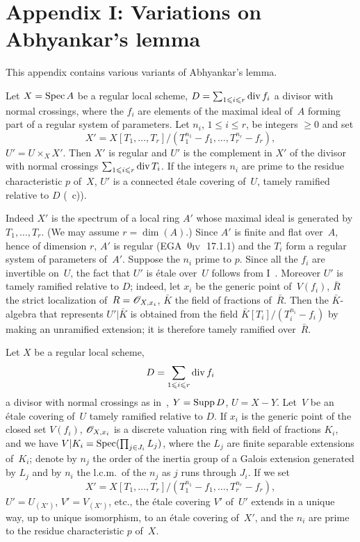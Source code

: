 \section{Appendix I: Variations on Abhyankar's lemma}
\label{XIII.5}
%
This appendix contains various variants of Abhyankar's lemma.

\begin{proposition}
\label{XIII.5.1} Let $X=\operatorname{Spec} A$ be a regular local scheme,
$D=\sum_{1\leqslant i\leqslant r} \operatorname{\mathrm{div}} f_i$ a divisor with normal
crossings, where the $f_i$ are elements of the
maximal ideal of~$A$ forming part of a regular system of
parameters. Let $n_i$, $1\leq i\leq r$, be integers $\geq 0$
and set
$$
X'=X[T_1,\dots,T_r]/(T_1^{n_1}-f_1,\dots,T_r^{n_r}-f_r),
$$
$U'=U\times_X X'$. Then $X'$ is regular and $U'$ is the
complement in $X'$ of the divisor with normal crossings
$\sum_{1\leqslant i\leqslant r}\operatorname{\mathrm{div}} T_i$. If the integers $n_i$ are prime
to the residue characteristic $p$ of~$X$, $U'$ is a
connected \'etale covering of~$U$, tamely
ramified relative to $D$ \textup{(~c))}.
\end{proposition}

Indeed $X'$ is the spectrum of a local ring $A'$ whose
maximal ideal is generated by $T_1,\dots,T_r$.
(We may assume $r=\dim(A)$.)
Since $A'$ is finite and flat over~$A$, hence of dimension $r$, $A'$ is
regular (EGA~$0_{\textup{IV}}$~17.1.1) and the $T_i$ form a regular
system of parameters of~$A'$. Suppose the $n_i$ prime
to $p$. Since all the $f_i$ are invertible on~$U$, the fact that
$U'$ is \'etale over~$U$ follows from I~. Moreover $U'$
is tamely ramified relative to $D$; indeed, let
$x_i$ be the generic point of~$V(f_i)$, $\bar{R}$ the
strict localization of~$R=\cal{O}_{X,x_i}$, $\bar{K}$ the field of
fractions of~$\bar{R}$. Then the $\bar{K}$-algebra that
represents $U'|\bar{K}$ is obtained from the field
$\bar{K}[T_i]/(T_i^{n_i}-f_i)$ by making an unramified
extension; it is therefore tamely ramified over~$\bar{R}$.

\begin{proposition}
\label{XIII.5.2}
%
Let $X$ be a regular local scheme,
$$
D=\sum_{1\leqslant i\leqslant r} \operatorname{\mathrm{div}} f_i
$$
a divisor with normal crossings as in~,
$Y=\operatorname{Supp} D$, $U=X-Y$. Let~$V$ be an \'etale covering of~$U$
tamely ramified relative to $D$. If $x_i$ is the
generic point of the closed set $V(f_i)$, $\cal{O}_{X,x_i}$ is
a discrete valuation ring with field of fractions $K_i$, and
we have $V|K_i=\operatorname{Spec}(\prod_{j\in J_i}L_j)$, where the $L_j$ are
finite separable extensions of~$K_i$; denote by $n_j$ the order of the
inertia group of a Galois extension generated by $L_j$
and by $n_i$ the l.c.m.\ of the $n_j$ as $j$ runs through $J_i$. If we set
$$
X'=X[T_1,\dots,T_r]/(T_1^{n_1}-f_1,\dots,T_r^{n_r}-f_r),
$$
$U'=U_{(X')}$, $V'=V_{(X')}$, etc., the \'etale covering $V'$
of~$U'$ extends in a unique way, up to unique isomorphism,
to an \'etale covering of~$X'$, and the $n_i$ are
prime to the residue characteristic $p$ of~$X$.
\end{proposition}

